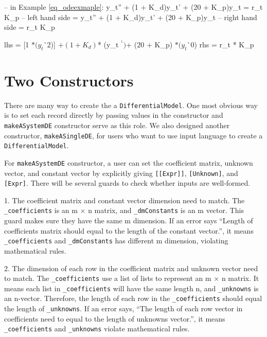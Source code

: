 \begin{listing}[ht]
\begin{haskell1}
-- in Example \ref{eq_odeexmaple}: y\_t'' + (1 + K\_d)y\_t' + (20 + K\_p)y\_t = r\_t K\_p
-- left hand side = y\_t'' + (1 + K\_d)y\_t' + (20 + K\_p)y\_t 
-- right hand side = r\_t K\_p

lhs = [1 $* (y_t $^^ 2)]
	$+ (1 + K_d) $* (y_t $^^ 1)
	$+ (20 + K_p) $* (y_t $^^ 0)
rhs = r_t * K_p
\end{haskell1}
\label{code_exinputl}
\end{listing}

\section{Two Constructors}
There are many way to create the a \verb|DifferentialModel|. One most obvious way is to set each record directly by passing values in the constructor and \verb|makeASystemDE| constructor serve as this role. We also designed another constructor, \verb|makeASingleDE|, for users who want to use input language to create a \verb|DifferentialModel|.

For \verb|makeASystemDE| constructor, a user can set the coefficient matrix, unknown vector, and constant vector by explicitly giving \verb|[[Expr]]|, \verb|[Unknown]|, and \verb|[Expr]|. There will be several guards to check whether inputs are well-formed.

1. The coefficient matrix and constant vector dimension need to match. The \verb|_coefficients| is an m $\times$ n matrix, and \verb|_dmConstants| is an m vector. This guard makes sure they have the same m dimension. If an error says ``Length of coefficients matrix should equal to the length of the constant vector.'', it means \verb|_coefficients| and \verb|_dmConstants| has different m dimension, violating mathematical rules.

2. The dimension of each row in the coefficient matrix and unknown vector need to match. The \verb|_coefficients| use a list of lists to represent an m $\times$ n matrix. It means each list in \verb|_coefficients| will have the same length n, and \verb|_unknowns| is an n-vector. Therefore, the length of each row in the \verb|_coefficients| should equal the length of \verb|_unknowns|. If an error says, ``The length of each row vector in coefficients need to equal to the length of unknowns vector.'', it means \verb|_coefficients| and \verb|_unknowns| violate mathematical rules.

